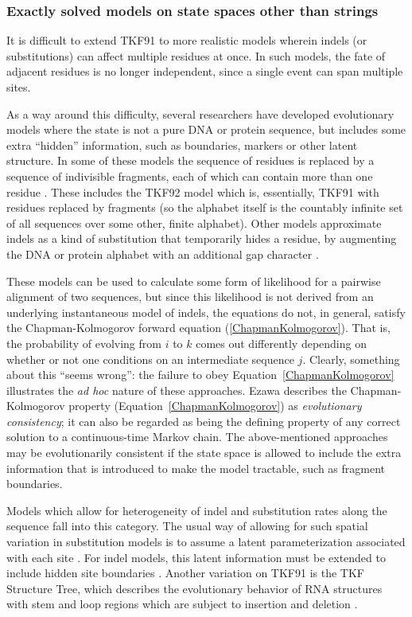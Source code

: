\documentclass{bmcart}
\newcommand{\eqref}[1]{Equation~\ref{#1}}
\begin{document}
\subsubsection*{Exactly solved models on state spaces other than strings}

It is difficult to extend TKF91 to more realistic models wherein indels (or substitutions)
can affect multiple residues at once.
In such models, the fate of adjacent residues is no longer independent, since a single event can span multiple sites.

As a way around this difficulty, several researchers have developed
evolutionary models where the state is not a pure DNA or protein sequence,
but includes some extra ``hidden'' information,
such as boundaries, markers or other latent structure.
In some of these models the sequence of residues is replaced by a sequence of indivisible fragments,
each of which can contain more than one residue \cite{ThorneEtal92,Metzler2003,RivasEddy2015}.
These includes the TKF92 model \cite{ThorneEtal92} which is, essentially, TKF91 with residues replaced by
fragments (so the alphabet itself is the countably infinite set of all sequences over some other, finite alphabet).
Other models approximate indels as a kind of substitution that temporarily hides a residue,
by augmenting the DNA or protein alphabet with an additional gap character \cite{Rivas05,RivasEddy2008}.

These models can be used to calculate some form of likelihood for a pairwise alignment of two sequences,
but since this likelihood is not derived from an underlying instantaneous model of indels,
the equations do not, in general, satisfy the Chapman-Kolmogorov forward equation
(\ref{ChapmanKolmogorov}).
That is, the probability of evolving from $i$ to $k$ comes out differently
depending on whether or not one conditions on an intermediate sequence $j$.
Clearly, something about this ``seems wrong'':
the failure to obey \eqref{ChapmanKolmogorov} illustrates the {\em ad hoc}
nature of these approaches.
Ezawa \cite{Ezawa2016b} describes the Chapman-Kolmogorov property
(\eqref{ChapmanKolmogorov}) as {\em evolutionary consistency};
it can also be regarded as being the defining property
of any correct solution to a continuous-time Markov chain.
The above-mentioned approaches may be evolutionarily consistent if the state space
is allowed to include the extra information that is introduced to make the model tractable,
such as fragment boundaries.

Models which allow for heterogeneity of indel and substitution rates along the sequence
fall into this category. The usual way of allowing for such spatial variation
in substitution models is to assume a latent parameterization associated with each site \cite{Yang93,Yang94}.
For indel models, this latent information must be extended to include hidden site boundaries \cite{RivasEddy2015}.
Another variation on TKF91 is the TKF Structure Tree, which describes the evolutionary behavior
of RNA structures with stem and loop regions which are subject to insertion and deletion \cite{Holmes2004}.
\end{document}
